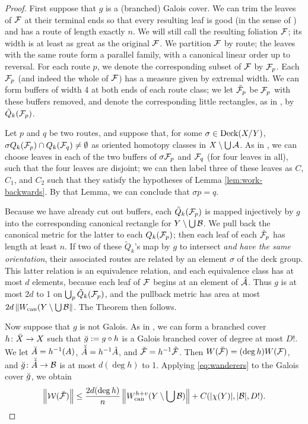 \documentclass[12pt]{amsart}
\begin{document}
\begin{proof}
First suppose that $g$ is a (branched) Galois cover.
We can trim the leaves of $\FF$ at their terminal ends so that every resulting leaf is good (in the sense of \cite{KL:QA}) and has a route of length exactly $n$. We will still call the resulting foliation $\FF$; its width is at least as great as the original $\FF$.
We partition $\FF$ by route; the leaves with the same route form a parallel family, with a canonical linear order up to reversal. For each route $p$, we denote the corresponding subset of $\FF$ by $\FF_p$. Each $\FF_p$ (and indeed the whole of $\FF$) has a measure given by extremal width. We can form buffers of width 4 at both ends of each route class; we let $\tilde \FF_p$ be $\FF_p$ with these buffers removed, and denote the corresponding little rectangles, as in \cite{KL:QA}, by $\tilde Q_k(\FF_p)$. 

Let $p$ and $q$ be two routes, and suppose that, for some $\sigma \in \Deck(X/Y)$,  $\sigma Q_k(\FF_p) \cap Q_k(\FF_q) \neq \emptyset$ as oriented homotopy classes in $X \sm \bigcup \AA$.  As in \cite{KL:QA}, we can choose leaves in each of the two buffers of $\sigma\FF_p$ and $\FF_q$ (for four leaves in all), such that the four leaves are disjoint; we can then label three of these leaves as $C$, $C_1$, and $C_2$ such that they satisfy the hypotheses of Lemma \ref{lem:work-backwards}. By that Lemma, we can conclude that $\sigma p = q$. 

Because we have already cut out buffers,
each $\tilde Q_k(\FF_p)$ is mapped injectively by $g$ into the corresponding canonical rectangle for $Y \sm \bigcup \BB$. 
We pull back the canonical metric for the latter to each $Q_k(\FF_p)$; then each leaf of each $\tilde \FF_p$ has length at least $n$. 
If two of these $\tilde Q_k$'s map by $g$ to intersect \emph{and have the same orientation},
their associated routes are related by an element $\sigma$ of the deck group.
This latter relation is an equivalence relation,
and each equivalence class has at most $d$ elements, 
because each leaf of $\FF$ begins at an element of $\hat \AA$.
Thus $g$ is at most $2d$ to 1 on $\bigcup_p \tilde Q_k(\FF_p)$, and the pullback metric has area at most $2d \norm{\wcan(Y \sm \bigcup \BB}$. 
The Theorem then follows.

Now suppose that $g$ is not Galois. As in \cite{KL:QA}, we can form a branched cover $h\from \gc X \to X$ such that $\gc g := g \circ h$ is a Galois branched cover of degree at most $D!$. We let $\gc A = h^{-1}(A)$,  $\gc{\hat A} = h^{-1} \hat A$, and $\gc \FF = h^{-1} \hat \FF$. Then $W(\gc \FF) = (\deg h) W(\FF)$, and $\gc g\from \gc {\hat A} \to \BB$ is at most $d(\deg h)$ to 1.  Applying \eqref{eq:wanderers} to the Galois cover $\gc g$, we obtain
$$
\norm{\WW(\gc \FF)} \le \frac{2d(\deg h)}n \norm{\wcan^{h+v}(Y \sm \bigcup \BB)} + C(|\chi(Y)| , |\BB|, D!). \qedhere
$$
\end{proof}


\printindex




\printbibliography
\end{document}
